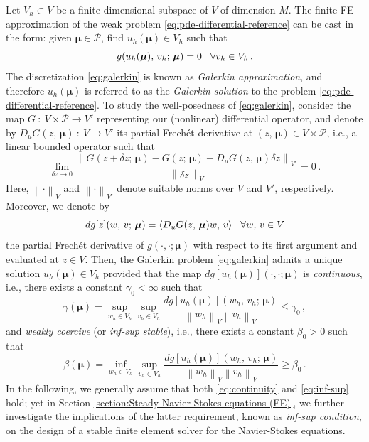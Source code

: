 \documentclass[12pt, a4paper, twoside, openright]{report}
\numberwithin{equation}{chapter}
\theoremstyle{theorem}
\theoremstyle{definition}
\theoremstyle{remark}
\theoremstyle{proposition}
\numberwithin{figure}{chapter}
\newcommand{\norm}[1]{\left\lVert#1\right\rVert}
\newcommand{\bg}[1]{\boldsymbol{#1}}
\begin{document}
		Let $V_h \subset V$ be a finite-dimensional subspace of $V$ of dimension $M$. The finite FE approximation of the weak problem \eqref{eq:pde-differential-reference} can be cast in the form: given $\bg{\mu} \in \mathcal{P}$, find $u_h(\bg{\mu}) \in V_h$ such that 
		\begin{equation}
			\label{eq:galerkin}
			g(u_h(\bg{\mu}), \, v_h; \, \bg{\mu}) = 0 \hspace*{0.3cm} \forall v_h \in V_h \, .
		\end{equation}
		The discretization \eqref{eq:galerkin} is known as \emph{Galerkin approximation}, and therefore $u_h(\bg{\mu})$ is referred to as the \emph{Galerkin solution} to the problem \eqref{eq:pde-differential-reference}. To study the well-posedness of \eqref{eq:galerkin}, consider the map $G ~ : ~ V \times \mathcal{P} \rightarrow V'$ representing our (nonlinear) differential operator, and denote by $D_u G(z, \, \bg{\mu}) ~ : ~ V \rightarrow V'$ its partial Frech\'et derivative at $(z, \, \bg{\mu}) \in V \times \mathcal{P}$, i.e., a linear bounded operator such that \cite{Rud64}
		\begin{equation*}
			\lim_{\delta z \to 0} \dfrac{\norm{G(z + \delta z; \, \bg{\mu}) - G(z; \, \bg{\mu}) - D_u G(z, \, \bg{\mu})\delta z}_{V'}}{\norm{\delta z}_V}  = 0 \, .
		\end{equation*}
		Here, $\norm{\cdot}_V$ and $\norm{\cdot}_{V'}$ denote suitable norms over $V$ and $V'$, respectively. Moreover, we denote by
		\begin{equation*}
			dg[z](w, \, v; \, \bg{\mu}) = \langle D_u G(z, \, \bg{\mu}) w, \, v \rangle \hspace*{0.3cm} \forall w, \, v \in V
		\end{equation*}
		the partial Frech\'et derivative of $g(\cdot, \cdot; \bg{\mu})$ with respect to its first argument and evaluated at $z \in V$. Then, the Galerkin problem \eqref{eq:galerkin} admits a unique solution $u_h(\bg{\mu}) \in V_h$ provided that the map $dg[u_h(\bg{\mu})](\cdot,\cdot; \bg{\mu})$ is \emph{continuous}, i.e., there exists a constant $\gamma_0 < \infty$ such that
		\begin{equation}
			\label{eq:continuity}
			\gamma(\bg{\mu}) = \sup_{w_h \in V_h} \sup_{v_h \in V_h} \dfrac{dg[u_h(\bg{\mu})](w_h, \, v_h; \, \bg{\mu})}{\norm{w_h}_V \norm{v_h}_V} \leq \gamma_0 \, ,
		\end{equation}
		and \emph{weakly coercive} (or \emph{inf-sup stable}), i.e., there exists a constant $\beta_0 > 0$ such that
		\begin{equation}
			\label{eq:inf-sup}
			\beta(\bg{\mu}) = \inf_{w_h \in V_h} \sup_{v_h \in V_h} \dfrac{dg[u_h(\bg{\mu})](w_h, \, v_h; \, \bg{\mu})}{\norm{w_h}_V \norm{v_h}_V} \geq \beta_0 \, .
		\end{equation}
		In the following, we generally assume that both \eqref{eq:continuity} and \eqref{eq:inf-sup} hold; yet in Section \ref{section:Steady Navier-Stokes equations (FE)}, we further investigate the implications of the latter requirement, known as \emph{inf-sup condition}, on the design of a stable finite element solver for the Navier-Stokes equations.
		
\end{document}
